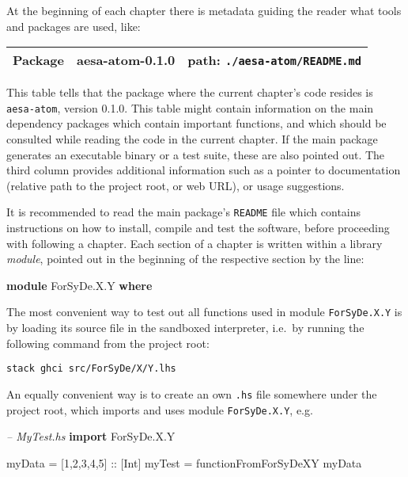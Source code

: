 \documentclass[
  a4paper,
]{article}
\newenvironment{Shaded}{}{}
\newcommand{\CommentTok}[1]{\textcolor[rgb]{0.38,0.63,0.69}{\textit{#1}}}
\newcommand{\DataTypeTok}[1]{\textcolor[rgb]{0.56,0.13,0.00}{#1}}
\newcommand{\DecValTok}[1]{\textcolor[rgb]{0.25,0.63,0.44}{#1}}
\newcommand{\FunctionTok}[1]{\textcolor[rgb]{0.02,0.16,0.49}{#1}}
\newcommand{\KeywordTok}[1]{\textcolor[rgb]{0.00,0.44,0.13}{\textbf{#1}}}
\newcommand{\NormalTok}[1]{#1}
\newcommand{\OtherTok}[1]{\textcolor[rgb]{0.00,0.44,0.13}{#1}}
\begin{document}
At the beginning of each chapter there is metadata guiding the reader
what tools and packages are used, like:

\begin{longtable}[]{@{}lll@{}}
\toprule
\endhead
Package & aesa-atom-0.1.0 & path:
\texttt{./aesa-atom/README.md}\tabularnewline
\bottomrule
\end{longtable}

This table tells that the package where the current chapter's code
resides is \texttt{aesa-atom}, version 0.1.0. This table might contain
information on the main dependency packages which contain important
functions, and which should be consulted while reading the code in the
current chapter. If the main package generates an executable binary or a
test suite, these are also pointed out. The third column provides
additional information such as a pointer to documentation (relative path
to the project root, or web URL), or usage suggestions.

It is recommended to read the main package's \texttt{README} file which
contains instructions on how to install, compile and test the software,
before proceeding with following a chapter. Each section of a chapter is
written within a library \emph{module}, pointed out in the beginning of
the respective section by the line:

\begin{Shaded}
\begin{Highlighting}[numbers=left,,]
\KeywordTok{module} \DataTypeTok{ForSyDe.X.Y} \KeywordTok{where}
\end{Highlighting}
\end{Shaded}

The most convenient way to test out all functions used in module
\texttt{ForSyDe.X.Y} is by loading its source file in the sandboxed
interpreter, i.e.~by running the following command from the project
root:

\begin{verbatim}
stack ghci src/ForSyDe/X/Y.lhs
\end{verbatim}

An equally convenient way is to create an own \texttt{.hs} file
somewhere under the project root, which imports and uses module
\texttt{ForSyDe.X.Y}, e.g.

\begin{Shaded}
\begin{Highlighting}[numbers=left,,]
\CommentTok{-- MyTest.hs}
\KeywordTok{import} \DataTypeTok{ForSyDe.X.Y}

\NormalTok{myData }\FunctionTok{=}\NormalTok{ [}\DecValTok{1}\NormalTok{,}\DecValTok{2}\NormalTok{,}\DecValTok{3}\NormalTok{,}\DecValTok{4}\NormalTok{,}\DecValTok{5}\NormalTok{]}\OtherTok{ ::}\NormalTok{ [}\DataTypeTok{Int}\NormalTok{]}
\NormalTok{myTest }\FunctionTok{=}\NormalTok{ functionFromForSyDeXY myData}
\end{Highlighting}
\end{Shaded}
\end{document}
